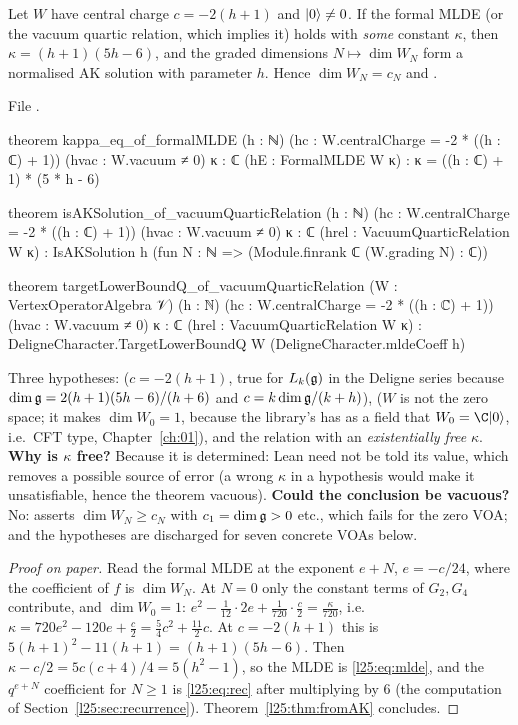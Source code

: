 \begin{theorem}\label{l25:thm:kappa}
Let $W$ have central charge $c=-2(h+1)$ and $|0\rangle\ne0$. If the formal MLDE (or the vacuum
quartic relation, which implies it) holds with \emph{some} constant $\kappa$, then $\kappa=(h+1)(5h-6)$, and the graded dimensions
$N\mapsto\dim W_N$ form a normalised AK solution with parameter $h$. Hence $\dim W_N=c_N$ and
.
\end{theorem}
\noindent File .
\begin{leancode}
theorem kappa_eq_of_formalMLDE (h : ℕ) (hc : W.centralCharge = -2 * ((h : ℂ) + 1))
    (hvac : W.vacuum ≠ 0) {κ : ℂ} (hE : FormalMLDE W κ) :
    κ = ((h : ℂ) + 1) * (5 * h - 6)

theorem isAKSolution_of_vacuumQuarticRelation (h : ℕ)
    (hc : W.centralCharge = -2 * ((h : ℂ) + 1)) (hvac : W.vacuum ≠ 0) {κ : ℂ}
    (hrel : VacuumQuarticRelation W κ) :
    IsAKSolution h (fun N : ℕ => (Module.finrank ℂ (W.grading N) : ℂ))

theorem targetLowerBoundQ_of_vacuumQuarticRelation (W : VertexOperatorAlgebra 𝒱) (h : ℕ)
    (hc : W.centralCharge = -2 * ((h : ℂ) + 1)) (hvac : W.vacuum ≠ 0)
    {κ : ℂ} (hrel : VacuumQuarticRelation W κ) :
    DeligneCharacter.TargetLowerBoundQ W (DeligneCharacter.mldeCoeff h)
\end{leancode}
\begin{dictionary}
Three hypotheses:  ($c=-2(h+1)$, true for $L_k(\mathfrak g)$ in the Deligne series because
$\dim\mathfrak g=2(h+1)(5h-6)/(h+6)$ and $c=k\dim\mathfrak g/(k+h)$),  ($W$ is not the zero space; it
makes $\dim W_0=1$, because the library's  has as a field  that
$W_0=\C\ltwentyfivevac$, i.e.\ CFT type, Chapter~\ref{ch:01}), and the relation with an \emph{existentially free} $\kappa$. \textbf{Why is $\kappa$ free?}
Because it is determined: Lean need not be told its value, which removes a possible source of error (a wrong
$\kappa$ in a hypothesis would make it unsatisfiable, hence the theorem vacuous). \textbf{Could the conclusion be
vacuous?} No:  asserts $\dim W_N\ge c_N$ with $c_1=\dim\mathfrak g>0$ etc., which fails for
the zero VOA; and the hypotheses are discharged for seven concrete VOAs below.
\end{dictionary}
\begin{proof}[Proof on paper]
Read the formal MLDE at the exponent $e+N$, $e=-c/24$, where the coefficient of $f$ is $\dim W_N$. At $N=0$ only
the constant terms of $G_2,G_4$ contribute, and $\dim W_0=1$:
$e^2-\frac{1}{12}\cdot2e+\frac1{720}\cdot\frac c2=\frac{\kappa}{720}$, i.e.\ $\kappa=720e^2-120e+\frac c2
=\frac54c^2+\frac{11}2c$. At $c=-2(h+1)$ this is $5(h+1)^2-11(h+1)=(h+1)(5h-6)$. Then
$\kappa-c/2=5c(c+4)/4=5(h^2-1)$, so the MLDE is \eqref{l25:eq:mlde}, and the $q^{e+N}$ coefficient for $N\ge1$ is
\eqref{l25:eq:rec} after multiplying by $6$ (the computation of Section~\ref{l25:sec:recurrence}).
Theorem~\ref{l25:thm:fromAK} concludes.
\end{proof}
